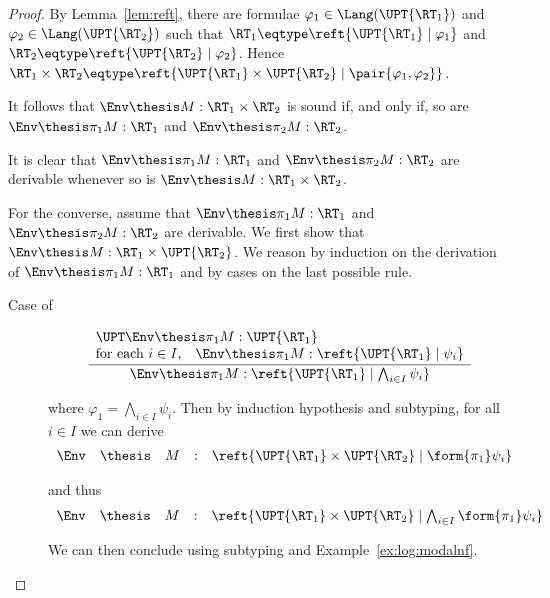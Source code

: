 \begin{proof}
By Lemma~\ref{lem:reft},
there are formulae
$\varphi_1 \in \Lang(\UPT{\RT_1})$
and
$\varphi_2 \in \Lang(\UPT{\RT_2})$
such that
$\RT_1 \eqtype \reft{\UPT{\RT_1} \mid \varphi_1}$
and
$\RT_2 \eqtype \reft{\UPT{\RT_2} \mid \varphi_2}$.
Hence
\(
  \RT_1 \times \RT_2
  \eqtype
  \reft{\UPT{\RT_1} \times \UPT{\RT_2} \mid \pair{\varphi_1,\varphi_2}}
\).


It follows that
$\Env \thesis M : \RT_1 \times \RT_2$
is sound if, and only if,
so are $\Env \thesis \pi_1 M : \RT_1$
and $\Env \thesis \pi_2 M : \RT_2$.

It is clear that $\Env \thesis \pi_1 M : \RT_1$
and $\Env \thesis \pi_2 M : \RT_2$
are derivable whenever so is
$\Env \thesis M : \RT_1 \times \RT_2$.

For the converse, assume that
$\Env \thesis \pi_1 M : \RT_1$
and $\Env \thesis \pi_2 M : \RT_2$
are derivable.
We first show that
$\Env \thesis M : \RT_1 \times \UPT{\RT_2}$.
We reason by induction on the derivation of $\Env \thesis \pi_1 M : \RT_1$
and by cases on the last possible rule.
\begin{description}
\item[Case of]
\[
\dfrac{
  \begin{array}{l}
  \UPT\Env \thesis \pi_1 M : \UPT{\RT_1}
  \\
  \text{for each $i \in I$,}\quad \Env \thesis \pi_1 M : \reft{\UPT{\RT_1} \mid \psi_i}
  \end{array}}
  {\Env \thesis \pi_1 M : \reft{\UPT{\RT_1} \mid \bigwedge_{i \in I} \psi_i}}
\]

\noindent
where $\varphi_1 = \bigwedge_{i \in I}\psi_i$.
Then by induction hypothesis and subtyping,
for all $i \in I$ we can derive
\[
\begin{array}{*{5}{l}}
  \Env
& \thesis
& M
& :
& \reft{\UPT{\RT_1} \times \UPT{\RT_2} \mid \form{\pi_1}\psi_i}
\end{array}
\]

\noindent
and thus
\[
\begin{array}{*{5}{l}}
  \Env
& \thesis
& M
& :
& \reft{\UPT{\RT_1} \times \UPT{\RT_2} \mid \bigwedge_{i \in I} \form{\pi_1}\psi_i}
\end{array}
\]

\noindent
We can then conclude using subtyping and Example~\ref{ex:log:modalnf}.


\end{description}
\end{proof}
